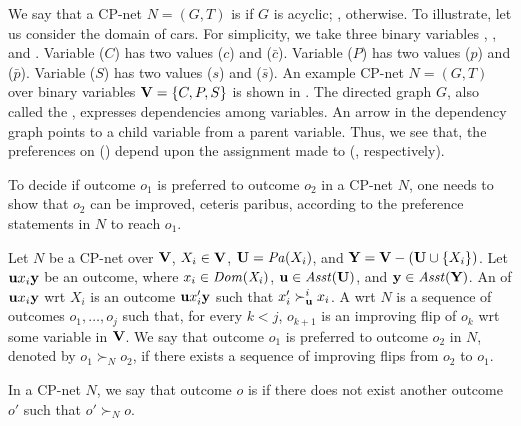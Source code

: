 We say that a CP-net $N=(G,T)$ is  if
$G$ is acyclic; , otherwise.
To illustrate, let us consider the domain of cars.
For simplicity, we take three binary variables
, , and .
Variable  ($C$) has two values  ($c$) 
and  ($\bar{c}$).
Variable  ($P$) has two values  ($p$) 
and  ($\bar{p}$).
Variable  ($S$) has two values  ($s$) 
and  ($\bar{s}$).
An example CP-net $N=(G,T)$ over binary variables $\textbf{V}=\{C,P,S\}$
is shown in .
The directed graph $G$, also called the , expresses
dependencies among variables.  An arrow in the dependency graph points
to a child variable from a parent variable. Thus, we see that,
the preferences on  () depend upon the assignment made
to  (, respectively).

To decide if outcome $o_1$ is preferred to outcome $o_2$ in a CP-net $N$,
one needs to show that $o_2$ can be improved, ceteris paribus, 
according to the preference statements in $N$ to reach $o_1$.

\begin{definition}
	Let $N$ be a CP-net over $\textbf{V}$, $X_i \in \textbf{V}$, $\textbf{U} = \mathit{Pa}(X_i)$,
	and $\textbf{Y}=\textbf{V}-(\textbf{U} \cup \{X_i\})$.
	Let $\textbf{u} x_i \textbf{y}$ be an outcome, where $x_i\in \it{Dom}(X_i)$,
	$\textbf{u} \in \mathit{Asst}(\textbf{U})$, and $\textbf{y} \in \mathit{Asst}(\textbf{Y})$.
	An  of $\textbf{u} x_i \textbf{y}$ wrt $X_i$ is an
	outcome $\textbf{u} x_i' \textbf{y}$ such that $x_i' \succ^i_{\textbf{u}} x_i$.
	A  wrt $N$ is a sequence of
	outcomes $o_1,\ldots,o_j$ such that, for every $k<j$,
	$o_{k+1}$ is an improving flip of $o_k$ wrt some variable in $\textbf{V}$.
	We say that outcome $o_1$ is preferred to outcome $o_2$ in $N$,
	denoted by $o_1 \succ_N o_2$, if there exists a sequence of
	improving flips from $o_2$ to $o_1$.
\end{definition}

In a CP-net $N$, we say that outcome $o$ is  if
there does not exist another outcome $o'$ such that
$o' \succ_N o$.


